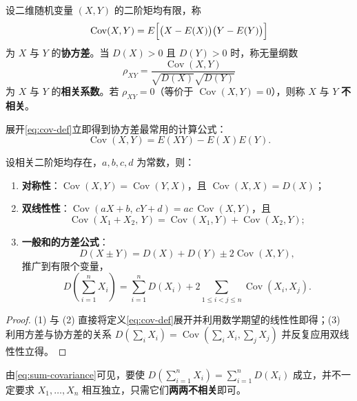 \begin{definition}[协方差与相关系数]
\label{def:covariance}
设二维随机变量 $(X,Y)$ 的二阶矩均有限，称
\begin{equation}
  \operatorname{Cov}(X,Y)=E\Bigl[\bigl(X-E(X)\bigr)\bigl(Y-E(Y)\bigr)\Bigr]
  \label{eq:cov-def}
\end{equation}
为 $X$ 与 $Y$ 的\textbf{协方差}。当 $D(X)>0$ 且 $D(Y)>0$ 时，称无量纲数
\begin{equation}
  \rho_{XY}=\frac{\operatorname{Cov}(X,Y)}{\sqrt{D(X)}\sqrt{D(Y)}}
  \label{eq:corr-def}
\end{equation}
为 $X$ 与 $Y$ 的\textbf{相关系数}。若 $\rho_{XY}=0$（等价于 $\operatorname{Cov}(X,Y)=0$），则称 $X$ 与 $Y$ \textbf{不相关}。
\end{definition}

展开\eqref{eq:cov-def}立即得到协方差最常用的计算公式：
\begin{equation}
  \operatorname{Cov}(X,Y)=E(XY)-E(X)E(Y).
  \label{eq:cov-calc}
\end{equation}

\begin{proposition}[协方差的基本性质与一般和的方差]
\label{prop:covariance-properties}
设相关二阶矩均存在，$a,b,c,d$ 为常数，则：
\begin{enumerate}
  \item \textbf{对称性}：$\operatorname{Cov}(X,Y)=\operatorname{Cov}(Y,X)$，且 $\operatorname{Cov}(X,X)=D(X)$；
  \item \textbf{双线性性}：$\operatorname{Cov}(aX+b,\,cY+d)=ac\,\operatorname{Cov}(X,Y)$，且
  \[
    \operatorname{Cov}(X_1+X_2,\,Y)=\operatorname{Cov}(X_1,Y)+\operatorname{Cov}(X_2,Y);
  \]
  \item \textbf{一般和的方差公式}：
  \begin{equation}
    D(X\pm Y)=D(X)+D(Y)\pm 2\operatorname{Cov}(X,Y),
    \label{eq:sum-covariance}
  \end{equation}
  推广到有限个变量，
  \[
    D\!\left(\sum_{i=1}^{n}X_i\right)=\sum_{i=1}^{n}D(X_i)+2\sum_{1\le i<j\le n}\operatorname{Cov}(X_i,X_j).
  \]
\end{enumerate}
\end{proposition}
\begin{proof}
(1) 与 (2) 直接将定义\eqref{eq:cov-def}展开并利用数学期望的线性性即得；(3) 利用方差与协方差的关系 $D(\sum_{i}X_i)=\operatorname{Cov}(\sum_{i}X_i,\sum_{j}X_j)$ 并反复应用双线性性立得。
\end{proof}

由\eqref{eq:sum-covariance}可见，要使 $D(\sum_{i=1}^{n}X_i)=\sum_{i=1}^{n}D(X_i)$ 成立，并不一定要求 $X_1,\ldots,X_n$ 相互独立，只需它们\textbf{两两不相关}即可。

